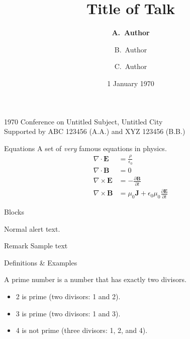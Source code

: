 \documentclass[noamssymb,noamsmath,aspectratio=169,9pt]{beamer}
\title{Title of Talk}
\author{\texorpdfstring{\textbf{A.~Author}}{A.~Author} \and B.~Author \and C.~Author}
\institute{Untitled Department, Untitled Institute}
\date{1 January 1970}
\begin{document}
\begin{frame}
  \titlepage
  \begin{center}
    {\small 1970 Conference on Untitled Subject, Untitled City\\[\baselineskip]}
    {\footnotesize Supported by ABC 123456 (A.A.) and XYZ 123456 (B.B.)}
  \end{center}
\end{frame}

\begin{frame}{Equations}
  A set of \emph{very} famous equations in physics.
  \begin{align*}
    \nabla\cdot\mathbf{E} &= \frac{\rho}{\epsilon_0}\\
    \nabla\cdot\mathbf{B} &= 0\\
    \nabla\times\mathbf{E} &= -\frac{\partial\mathbf{B}}{\partial{t}}\\
    \nabla\times\mathbf{B} &= \mu_0\mathbf{J} + \epsilon_0\mu_0\frac{\partial\mathbf{E}}{\partial{t}}
  \end{align*}
\end{frame}

\begin{frame}{Blocks}

\alert{Normal alert text.} 

\begin{block}{Remark}
Sample text
\end{block}

\end{frame}

\begin{frame}{Definitions \& Examples}
  \begin{definition}
    A \alert{prime number} is a number that has exactly two divisors.
  \end{definition}
  \begin{example}
  \begin{itemize}
    \item 2 is prime (two divisors: 1 and 2).
    \item 3 is prime (two divisors: 1 and 3).
    \item 4 is not prime (\alert{three} divisors: 1, 2, and 4).
  \end{itemize}
  \end{example}
\end{frame}
\end{document}
